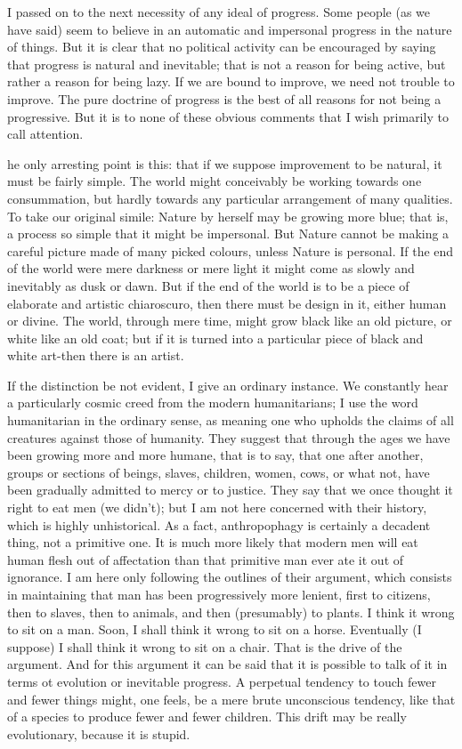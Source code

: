\documentclass{book}
\begin{document}
I passed on to the next necessity of any ideal of progress. Some people (as we have said) seem to believe in an automatic and impersonal progress in the nature of things. But it is clear that no political activity can be encouraged by saying that progress is natural and inevitable; that is not a reason for being active, but rather a reason for being lazy. If we are bound to improve, we need not trouble to improve. The pure doctrine of progress is the best of all reasons for not being a progressive. But it is to none of these obvious comments that I wish primarily to call attention.

he only arresting point is this: that if we suppose improvement to be natural, it must be fairly simple. The world might conceivably be working towards one consummation, but hardly towards any particular arrangement of many qualities. To take our original simile: Nature by herself may be growing more blue; that is, a process so simple that it might be impersonal. But Nature cannot be making a careful picture made of many picked colours, unless Nature is personal. If the end of the world were mere darkness or mere light it might come as slowly and inevitably as dusk or dawn. But if the end of the world is to be a piece of elaborate and artistic chiaroscuro, then there must be design in it, either human or divine. The world, through mere time, might grow black like an old picture, or white like an old coat; but if it is turned into a particular piece of black and white art-then there is an artist.

If the distinction be not evident, I give an ordinary instance. We constantly hear a particularly cosmic creed from the modern humanitarians; I use the word humanitarian in the ordinary sense, as meaning one who upholds the claims of all creatures against those of humanity. They suggest that through the ages we have been growing more and more humane, that is to say, that one after another, groups or sections of beings, slaves, children, women, cows, or what not, have been gradually admitted to mercy or to justice. They say that we once thought it right to eat men (we didn’t); but I am not here concerned with their history, which is highly unhistorical. As a fact, anthropophagy is certainly a decadent thing, not a primitive one. It is much more likely that modern men will eat human flesh out of affectation than that primitive man ever ate it out of ignorance. I am here only following the outlines of their argument, which consists in maintaining that man has been progressively more lenient, first to citizens, then to slaves, then to animals, and then (presumably) to plants. I think it wrong to sit on a man. Soon, I shall think it wrong to sit on a horse. Eventually (I suppose) I shall think it wrong to sit on a chair. That is the drive of the argument. And for this argument it can be said that it is possible to talk of it in terms ot evolution or inevitable progress. A perpetual tendency to touch fewer and fewer things might, one feels, be a mere brute unconscious tendency, like that of a species to produce fewer and fewer children. This drift may be really evolutionary, because it is stupid.
\end{document}
